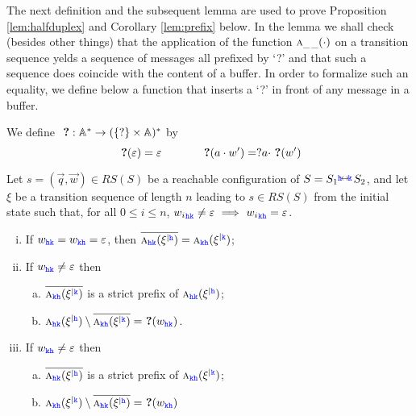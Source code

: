 The next definition and the subsequent lemma are used to prove Proposition \ref{lem:halfduplex}  and Corollary \ref{lem:prefix} below.
In the lemma we shall  check (besides other things) that
the application of the function $\symb{\_\,\_}{\cdot}$ on a transition sequence yelds a sequence of messages all
prefixed by `?' and that such a sequence does coincide with
 the content of a buffer. In order to formalize such an equality, we define below a function that inserts a `?' in front
 of any message in a buffer.
\begin{definition}
We define $\qm :\messages^* \rightarrow (\Set{?}\times\messages)^*$ by
$$\qm(\varepsilon) = \varepsilon \hspace{12mm} \qm(a\cdot w') = ?a\cdot\qm(w')$$
\end{definition}



\begin{lemma}%
\label{lem:prefixaux}
Let $s= (\vec{q},\vec{w}) \in RS(S)$ be a reachable configuration of
$S={S_{1}}\connect{\HH}{\KK} {S_{2}}$, and
let $\xi$ be a transition sequence of length $n$ leading to $s\in RS(S)$ from the initial state
such that, for all $0\leq i\leq n$, ${w_i}_{\HH\KK}\neq \varepsilon \implies {w_i}_{\KK\HH}= \varepsilon$.
\begin{enumerate}[i)]
\item
\label{lem:prefix-iii}
If $w_{\HH\KK}= w_{\KK\HH}=\varepsilon$, then
 $\Dual{\symb{\HH\KK}{\restrictup{\xi}{\HH}}}=\symb{\KK\HH}{\restrictup{\xi}{\KK}}$;

\item
\label{lem:prefix-i}

If $w_{\HH\KK}\neq\varepsilon$  then 
\begin{enumerate}[a)]
\item 
$\Dual{\symb{\KK\HH}{\restrictup{\xi}{\KK}}}$
 is a strict prefix of
$\symb{\HH\KK}{\restrictup{\xi}{\HH}}$;
\item
$\symb{\HH\KK}{\restrictup{\xi}{\HH}}\setminus \Dual{\symb{\KK\HH}{\restrictup{\xi}{\KK}}} = \qm({{w}_{\HH\KK}})$.
\end{enumerate}

\item
\label{lem:prefix-ii}

If $w_{\KK\HH}\neq\varepsilon$ then 
\begin{enumerate}[a)]
\item 
$\Dual{\symb{\HH\KK}{\restrictup{\xi}{\HH}}}$
 is a strict prefix of
$\symb{\KK\HH}{\restrictup{\xi}{\KK}}$;

\item
$\symb{\KK\HH}{\restrictup{\xi}{\KK}}\setminus \Dual{\symb{\HH\KK}{\restrictup{\xi}{\HH}}}
 = \qm({{w}_{\KK\HH}})$
\end{enumerate}
\end{enumerate}
\end{lemma}

